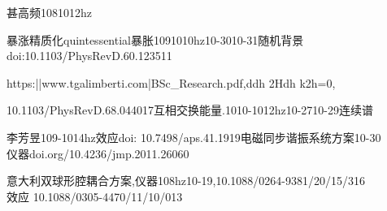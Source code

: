 \documentclass[12pt]{ctexart}
\title{}
\author{}
\begin{document}
甚高频1081012hz

暴涨精质化quintessential暴胀1091010hz10-3010-31随机背景\\doi:10.1103/PhysRevD.60.123511

https:||www.tgalimberti.com|BSc\_Research.pdf,ddh 2Hdh k2h=0,

10.1103/PhysRevD.68.044017互相交换能量.1010-1012hz10-2710-29连续谱



李芳昱109-1014hz效应doi: 10.7498/aps.41.1919电磁同步谐振系统方案10-30\\仪器doi.org/10.4236/jmp.2011.26060

意大利双球形腔耦合方案,仪器108hz10-19,10.1088/0264-9381/20/15/316\\效应 
10.1088/0305-4470/11/10/013 
\end{document}
